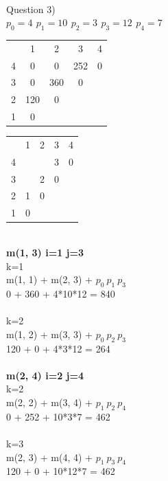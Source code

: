 \documentclass{article}
\begin{document}
\\
Question 3) \\
$ p_{0} = 4 \,\  p_{1} = 10 \,\  p_{2} = 3 \,\  p_{3} = 12 \,\  p_{4} = 7 $\\

\begin{tabular}{ c | c | c | c | c }
            
    & 1 & 2 & 3 & 4 \\ 
  4 & 0 & 0 & 252 & 0 \\  
  3 & 0 & 360 & 0 \\
  2 & 120 & 0 \\
  1 & 0     
\end{tabular}
\begin{tabular}{ c | c | c | c | c }
            
    & 1 & 2 & 3 & 4 \\ 
  4 &   &   & 3 & 0 \\  
  3 &   & 2 & 0 \\
  2 & 1 & 0 \\
  1 & 0     
\end{tabular}\\

    \textbf{m(1, 3) i=1 j=3} \\
    k=1 \\
    m(1, 1) + m(2, 3) + $ p_{0}\ p_{1}\  p_{3}$\\
    0 + 360 + 4*10*12 = 840 \\\\

    k=2 \\
    m(1, 2) + m(3, 3) + $ p_{0}\ p_{2}\  p_{3}$\\
    120 + 0 + 4*3*12 = 264\\\\

    \textbf{m(2, 4) i=2 j=4} \\
    k=2 \\
    m(2, 2) + m(3, 4) + $ p_{1}\ p_{2}\  p_{4}$\\
    0 + 252 + 10*3*7 = 462 \\\\

    k=3 \\
    m(2, 3) + m(4, 4) + $ p_{1}\ p_{3}\  p_{4}$\\
    120 + 0 + 10*12*7 = 462\\\\
\end{document}
